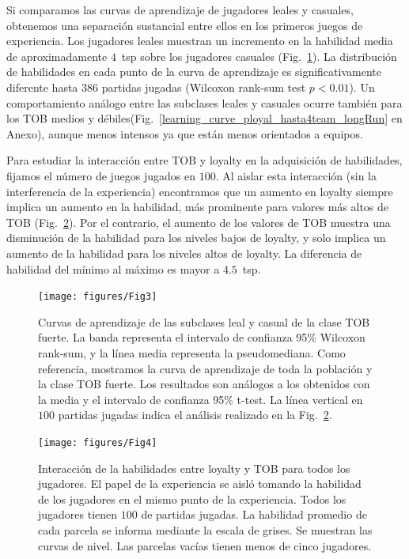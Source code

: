 \documentclass[a4paper,11pt]{book}
\theoremstyle{definition}
\begin{document}

Si comparamos las curvas de aprendizaje de jugadores leales y casuales, obtenemos una separaci\'on sustancial entre ellos en los primeros juegos de experiencia.
%
Los jugadores leales muestran un incremento en la habilidad media de aproximadamente $4$~tsp sobre los jugadores casuales (Fig.~\ref{learningskill_pteam89_ployal}).
%
La distribuci\'on de habilidades en cada punto de la curva de aprendizaje es significativamente diferente hasta $386$ partidas jugadas (Wilcoxon rank-sum test $p<0.01$).
%
Un comportamiento an\'alogo entre las subclases leales y casuales ocurre tambi\'en para los TOB medios y d\'ebiles(Fig.~\ref{learning_curve_ployal_hasta4team_longRun} en Anexo), aunque menos intensos ya que est\'an menos orientados a equipos.


Para estudiar la interacci\'on entre TOB y loyalty en la adquisici\'on de habilidades, fijamos el n\'umero de juegos jugados en $100$.
%
Al aislar esta interacci\'on (sin la interferencia de la experiencia) encontramos que un aumento en loyalty siempre implica un aumento en la habilidad, m\'as prominente para valores m\'as altos de TOB (Fig.~\ref{skillModels_loyaltyTeamOriented_imageEmpirical}).
%
Por el contrario, el aumento de los valores de TOB muestra una disminuci\'on de la habilidad para los niveles bajos de loyalty, y solo implica un aumento de la habilidad para los niveles altos de loyalty.
%
La diferencia de habilidad del m\'inimo al m\'aximo es mayor a $4.5$~tsp.

\clearpage
\begin{figure}[ht!]
\centering
\texttt{[image: figures/Fig3]}
\caption{
Curvas de aprendizaje de las subclases leal y casual de la clase TOB fuerte.
%
La banda representa el intervalo de confianza 95\% Wilcoxon rank-sum, y la l\'inea media representa la pseudomediana.
%
Como referencia, mostramos la curva de aprendizaje de toda la poblaci\'on y la clase TOB fuerte.
%
Los resultados son an\'alogos a los obtenidos con la media y el intervalo de confianza 95\% t-test.
%
La l\'inea vertical en $100$ partidas jugadas indica el an\'alisis realizado en la Fig.~\protect\ref{skillModels_loyaltyTeamOriented_imageEmpirical}.
}
\label{learningskill_pteam89_ployal}
\end{figure}

\begin{figure}[ht!]
\centering
\texttt{[image: figures/Fig4]}
\caption{
Interacci\'on de la habilidades entre loyalty y TOB para todos los jugadores.
%
El papel de la experiencia se aisl\'o tomando la habilidad de los jugadores en el mismo punto de la experiencia.
%
Todos los jugadores tienen $100$ de partidas jugadas.
%
La habilidad promedio de cada parcela se informa mediante la escala de grises.
%
Se muestran las curvas de nivel.
%
Las parcelas vac\'ias tienen menos de cinco jugadores.
}
\label{skillModels_loyaltyTeamOriented_imageEmpirical}
\end{figure}
\end{document}
